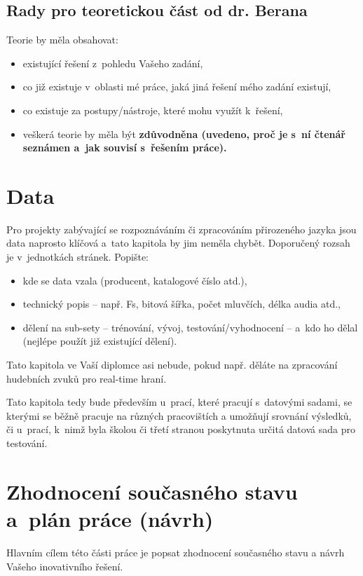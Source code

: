 \subsection*{Rady pro teoretickou část od dr. Berana}
Teorie by měla obsahovat:
\begin{itemize}
  \item{existující řešení z~pohledu Vašeho zadání,}
  \item{co již existuje v~oblasti mé práce, jaká jiná řešení mého zadání existují,}
  \item{co existuje za postupy/nástroje, které mohu využít k~řešení,}
  \item{veškerá teorie by měla být \bf zdůvodněna \rm (uvedeno, proč je s~ní čtenář seznámen a~jak souvisí s~řešením práce).}
\end{itemize}
    
\section{Data}

Pro projekty zabývající se rozpoznáváním či zpracováním přirozeného jazyka jsou data naprosto klíčová a~tato kapitola by jim neměla chybět. Doporučený rozsah je v~jednotkách stránek. Popište:
\begin{itemize}
  \item{kde se data vzala (producent, katalogové číslo atd.),}
  \item{technický popis -- např. Fs, bitová šířka, počet mluvčích, délka audia atd.,}
  \item{dělení na sub-sety -- trénování, vývoj, testování/vyhodnocení -- a~kdo ho dělal (nejlépe použít již existující dělení).}
\end{itemize}

Tato kapitola ve Vaší diplomce asi nebude, pokud např. děláte na zpracování hudebních zvuků pro real-time hraní.

Tato kapitola tedy bude především u~prací, které pracují s~datovými sadami, se kterými se běžně pracuje na různých pracovištích a umožňují srovnání výsledků, či u~prací, k~nimž byla školou či třetí stranou poskytnuta určitá datová sada pro testování.


\section{Zhodnocení současného stavu a~plán práce (návrh)}
\label{navrh}

Hlavním cílem této části práce je popsat zhodnocení současného stavu a návrh Vašeho inovativního řešení.

